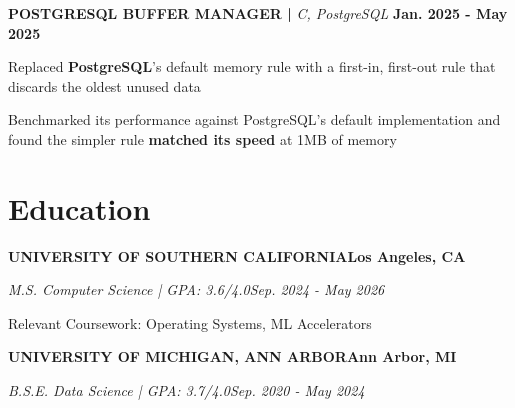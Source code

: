 \documentclass[10pt]{article}
\renewcommand{\note}[1]{#1\par}
\newcommand{\school}[4]{%
  \vspace{2pt}%
  \textbf{\MakeUppercase{#1}}\hfill\textbf{#2}\par
  \vspace{0.5pt}%
  \textit{#3}\hfill\textit{#4}\par
}
\newcommand{\proj}[4]{%
  \vspace{3pt}%
  \textbf{\MakeUppercase{#1} | }\textit{#2}\hfill
  \textbf{#4}%
  \notblank{#3}{\ \textbf{| #3}}{}%
  \par
}
\begin{document}
\proj{PostgreSQL Buffer Manager}{C, PostgreSQL}{USC}{Jan. 2025 - May 2025}
\begin{bullets}
  \item Replaced \textbf{PostgreSQL}'s default memory rule with a first-in, first-out rule that discards the oldest unused data
  \item Benchmarked its performance against PostgreSQL's default implementation and found the simpler rule \textbf{matched its speed} at 1MB of memory
\end{bullets}

\section{Education}
\vspace{-2pt}
\school{University of Southern California}{Los Angeles, CA}{M.S. Computer Science | GPA: 3.6/4.0}{Sep. 2024 - May 2026}
\note{Relevant Coursework: Operating Systems, ML Accelerators}

\school{University of Michigan, Ann Arbor}{Ann Arbor, MI}{B.S.E. Data Science | GPA: 3.7/4.0}{Sep. 2020 - May 2024}
\end{document}

